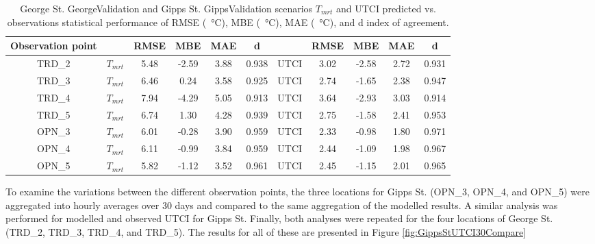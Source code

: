 \documentclass[final,3p,times,authoryear]{elsarticle}
\begin{document}
\begin{center}
\begin{table}[!htbp]
\caption{George St. GeorgeValidation and Gipps St. GippsValidation scenarios $T_{mrt}$ and UTCI predicted vs. observations statistical performance of RMSE (\SI{}{\degreeCelsius}), MBE (\SI{}{\degreeCelsius}), MAE (\SI{}{\degreeCelsius}), and d index of agreement.\label{tab:georgetmrt}}
  \begin{tabular}{ |c|c | c |c |c  | c | c | c| c | c|c|} 
	\hline \textbf{Observation point} 
	&\textbf{} 
	& \textbf{RMSE} 
	& \textbf{MBE} 
	& \textbf{MAE} 
	& \textbf{d} 
	&\textbf{} 
	& \textbf{RMSE} 
	& \textbf{MBE} 
	& \textbf{MAE}
	& \textbf{d}	
	\\ \hline
	
TRD\_2 &{$T_{mrt}$}   & 5.48 & -2.59 & 3.88 & 0.938 & {UTCI}	 & 3.02 & -2.58 & 2.72 & 0.931  \\ \hline
TRD\_3 &{$T_{mrt}$}  & 6.46 & 0.24 & 3.58 & 0.925& {UTCI}  & 2.74 & -1.65 & 2.38 & 0.947  \\ \hline
TRD\_4 &{$T_{mrt}$}  & 7.94 & -4.29 & 5.05 & 0.913& {UTCI}  & 3.64 & -2.93 & 3.03 & 0.914  \\ \hline
TRD\_5 &{$T_{mrt}$}  & 6.74 & 1.30  & 4.28& 0.939& {UTCI}  & 2.75 & -1.58 & 2.41 & 0.953  \\ \hline
OPN\_3 &{$T_{mrt}$}  & 6.01 & -0.28 & 3.90 & 0.959& {UTCI}  & 2.33 & -0.98 & 1.80 & 0.971   \\ \hline
OPN\_4 &{$T_{mrt}$}  & 6.11 & -0.99 & 3.84 & 0.959& {UTCI}  & 2.44 & -1.09 & 1.98 & 0.967   \\ \hline
OPN\_5 &{$T_{mrt}$}  & 5.82 & -1.12 & 3.52 & 0.961& {UTCI}  & 2.45 & -1.15 & 2.01 & 0.965  \\ \hline
  \end{tabular} 
\end{table}
\end{center} 


To examine the variations between the different observation points, the three locations for Gipps St. (OPN\_3, OPN\_4, and OPN\_5) were aggregated into hourly averages over 30 days and compared to the same aggregation of the modelled results. A similar analysis was performed for modelled and observed UTCI for Gipps St. Finally, both analyses were repeated for the four locations of George St. (TRD\_2, TRD\_3, TRD\_4, and TRD\_5). The results for all of these are presented in Figure \ref{fig:GippsStUTCI30Compare}
\end{document}
